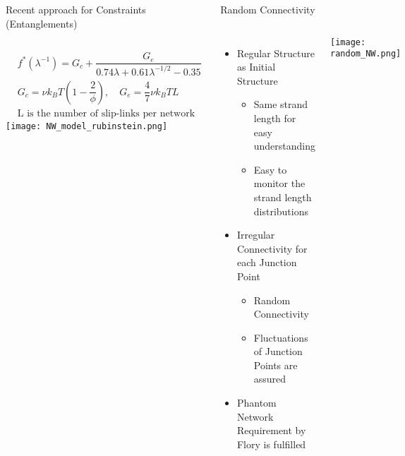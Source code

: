 \begin{columns}[totalwidth=.85\linewidth]
\begin{itembox}[l]{Recent approach for Constraints (Entanglements)}
		\begin{columns}[totalwidth=1\textwidth]
			\small
			\begin{align*}
				&f^*(\lambda^{-1}) = G_c + \dfrac{G_e}{0.74 \lambda + 0.61 \lambda^{-1/2} - 0.35} \\
				&G_c = \nu k_B T \left(1-\dfrac{2}{\phi} \right), \quad G_e = \dfrac{4}{7} \nu k_B T L \\
				& \text{L is the number of slip-links per network chain}
			\end{align*}
			\texttt{[image: NW\_model\_rubinstein.png]}
		\end{columns}
	\end{itembox}

	\begin{itembox}[l]{Random Connectivity\cite{flory2}}
		\begin{columns}[totalwidth=\textwidth]
				\begin{itemize}
					\item Regular Structure as Initial Structure
					\begin{itemize}
						\normalsize
						\item Same strand length for easy understanding
						\item Easy to monitor the strand length distributions
					\end{itemize}
					\item Irregular Connectivity for each Junction Point
						\begin{itemize}
							\normalsize
							\item Random Connectivity
							\item Fluctuations of Junction Points are assured
						\end{itemize}
					\item Phantom Network Requirement by Flory is fulfilled
				\end{itemize}
				\centering
				\texttt{[image: random\_NW.png]}
		\end{columns}
	\end{itembox}
\end{columns}